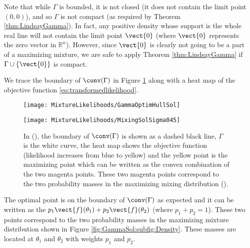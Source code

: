 	Note that while $\Gamma$ is bounded, it is not closed (it does not contain the limit point $(0,0)$), and so $\Gamma$ is not compact (as required by Theorem \ref{thm:LindsayGamma}). In fact, any positive density whose support is the whole real line will not contain the limit point $\vect{0}$ (where $\vect{0}$ represents the zero vector in $\mathbb{R}^n$). However, since $\vect{0}$ is clearly not going to be a part of a maximizing mixture, we are safe to apply Theorem \ref{thm:LindsayGamma} if $\Gamma \cup \{ \vect{0} \}$ is compact.


	We trace the boundary of $\conv(\Gamma)$ in Figure \ref{fig:GammaSol} along with a heat map of the objective function \eqref{eq:transformedlikelihood}.
	\begin{figure}[ht]
		\centering
		\begin{minipage}{0.4\textwidth}
			\texttt{[image: MixtureLikelihoods/GammaOptimHullSol]}
			\subcaption{}\label{fig:GammaSol:subfig:Gamma}
		\end{minipage}
		\begin{minipage}{0.5\textwidth}
			\texttt{[image: MixtureLikelihoods/MixingSolSigma045]}				\subcaption{}\label{fig:GammaSol:subfig:Density}
		\end{minipage}
		\caption{In (), the boundary of $\conv(\Gamma)$ is shown as a dashed black line, $\Gamma$ is the white curve, the heat map  shows the objective function (likelihood increases from blue to yellow) and the yellow point is the maximizing point which can be written as the convex combination of the two magenta points. These two magenta points correspond to the two probability masses in the maximizing mixing distribution ().}
		\label{fig:GammaSol}
	\end{figure}
	The optimal point is on the boundary of $\conv(\Gamma)$ as expected and it can be written as the  $p_1 \vect{f}(\theta_1) + p_2 \vect{f}(\theta_2)$ (where $p_1 + p_2 =1 $). These two points correspond to the two probability masses in the maximizing mixture distribution shown in Figure \ref{fig:GammaSol:subfig:Density}. These masses are located at $\theta_1$ and $\theta_2$ with weights $p_1$ and $p_2$.

